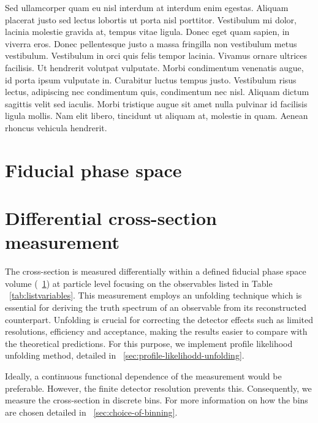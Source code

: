 Sed ullamcorper quam eu nisl interdum at interdum enim egestas. Aliquam placerat justo sed lectus lobortis ut porta nisl porttitor. Vestibulum mi dolor, lacinia molestie gravida at, tempus vitae ligula. Donec eget quam sapien, in viverra eros. Donec pellentesque justo a massa fringilla non vestibulum metus vestibulum. Vestibulum in orci quis felis tempor lacinia. Vivamus ornare ultrices facilisis. Ut hendrerit volutpat vulputate. Morbi condimentum venenatis augue, id porta ipsum vulputate in. Curabitur luctus tempus justo. Vestibulum risus lectus, adipiscing nec condimentum quis, condimentum nec nisl. Aliquam dictum sagittis velit sed iaculis. Morbi tristique augue sit amet nulla pulvinar id facilisis ligula mollis. Nam elit libero, tincidunt ut aliquam at, molestie in quam. Aenean rhoncus vehicula hendrerit.

\section{Fiducial phase space}
\label{sec:fiducial-phase-space}

\section{Differential cross-section measurement}
\label{sec:diff-xsec-measurement}
The cross-section is measured differentially within a defined fiducial phase space volume (~\cref{sec:fiducial-phase-space}) at particle level focusing on the observables listed in Table ~\cref{tab:listvariables}. This measurement employs an unfolding technique which is essential for deriving the truth spectrum of an observable from its reconstructed counterpart. Unfolding is crucial for correcting the detector effects such as limited resolutions, efficiency and acceptance, making the results easier to compare with the theoretical predictions. For this purpose, we implement profile likelihood unfolding method, detailed in ~\cref{sec:profile-likelihodd-unfolding}. 

Ideally, a continuous functional dependence of the measurement would be preferable. However, the finite detector resolution prevents this. Consequently, we measure the cross-section in discrete bins. For more information on how the bins are chosen detailed in ~\cref{sec:choice-of-binning}.


